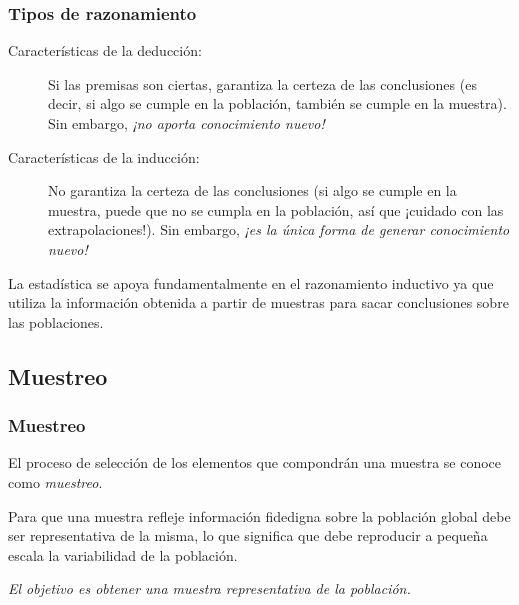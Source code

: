 \begin{frame}
\frametitle{Tipos de razonamiento}
\begin{description}
\item [Características de la deducción:] Si las premisas son ciertas, garantiza la certeza de las conclusiones (es decir, si algo se cumple en la población, también se cumple en la muestra). Sin embargo, \alert{\emph{¡no aporta conocimiento nuevo!}}
\item [Características de la inducción:] No garantiza la certeza de las conclusiones (si algo se cumple en la muestra, puede que no se cumpla en la población, así que ¡cuidado con las extrapolaciones!).
Sin embargo, \alert{\emph{¡es la única forma de generar conocimiento nuevo!}}
\end{description}

La estadística se apoya fundamentalmente en el razonamiento inductivo ya que utiliza la información obtenida a partir de muestras para sacar conclusiones sobre las poblaciones.
\end{frame}


\subsection{Muestreo}
\begin{frame}
\frametitle{Muestreo}
\begin{definicion}[Muestreo]
El proceso de selección de los elementos que compondrán una muestra se conoce como \emph{muestreo}.
\end{definicion}
\begin{center}
\resizebox{0.8\textwidth}{!}{}
\end{center}
Para que una muestra refleje información fidedigna sobre la población global debe ser representativa de la misma, lo que significa que debe reproducir a pequeña escala la variabilidad de la población.

\begin{center}
\alert{\emph{El objetivo es obtener una muestra representativa de la población.}}
\end{center}
\end{frame}


